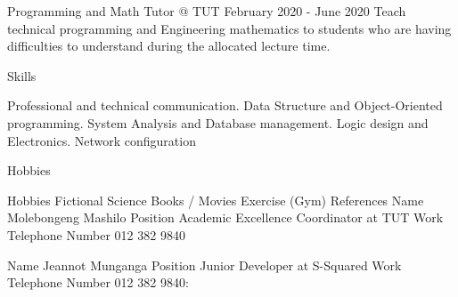 \documentclass[paper=a4,fontsize=12pt]{article} %
\begin{document}
Programming and Math Tutor @ TUT
February 2020 - June 2020
Teach technical programming and Engineering mathematics to students who are having difficulties to understand during the allocated lecture time.

Skills

Professional and technical communication. Data Structure and Object-Oriented programming. System Analysis and Database management. Logic design and Electronics. Network configuration

Hobbies

Hobbies				Fictional Science Books / Movies 
Exercise (Gym)
References
	Name 	            	Molebongeng Mashilo  
Position				Academic Excellence Coordinator at TUT
Work Telephone Number		012 382 9840

	Name 	            	Jeannot Munganga  
Position				Junior Developer at S-Squared
Work Telephone Number		012 382 9840:
\end{document}
